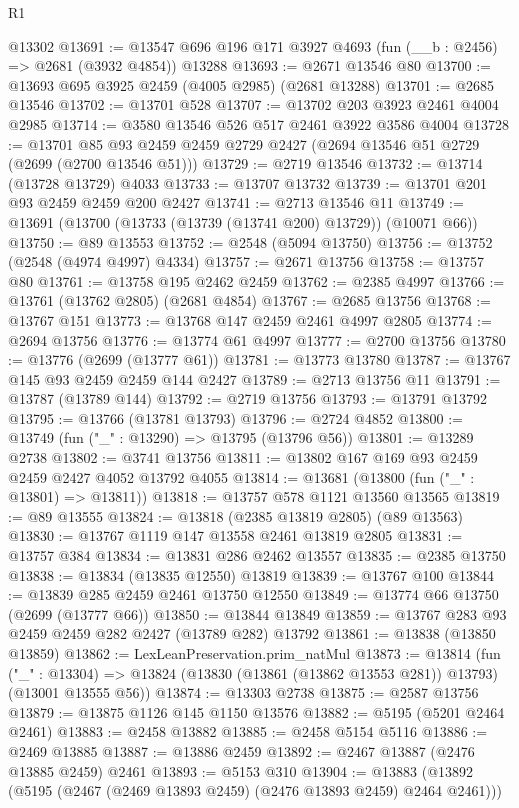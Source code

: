 \begin{lexlean}{R1}
\begin{coremodule}
    @13302
@13691 := @13547 @696 @196 @171 @3927 @4693 (fun (__b : @2456) => @2681 (@3932 @4854)) @13288
@13693 := @2671 @13546 @80
@13700 := @13693 @695 @3925 @2459 (@4005 @2985) (@2681 @13288)
@13701 := @2685 @13546
@13702 := @13701 @528
@13707 := @13702 @203 @3923 @2461 @4004 @2985
@13714 := @3580 @13546 @526 @517 @2461 @3922 @3586 @4004
@13728 := @13701 @85 @93 @2459 @2459 @2729 @2427 (@2694 @13546 @51 @2729 (@2699 (@2700 @13546 @51)))
@13729 := @2719 @13546
@13732 := @13714 (@13728 @13729) @4033
@13733 := @13707 @13732
@13739 := @13701 @201 @93 @2459 @2459 @200 @2427
@13741 := @2713 @13546 @11
@13749 := @13691 (@13700 (@13733 (@13739 (@13741 @200) @13729)) (@10071 @66))
@13750 := @89 @13553
@13752 := @2548 (@5094 @13750)
@13756 := @13752 (@2548 (@4974 @4997) @4334)
@13757 := @2671 @13756
@13758 := @13757 @80
@13761 := @13758 @195 @2462 @2459
@13762 := @2385 @4997
@13766 := @13761 (@13762 @2805) (@2681 @4854)
@13767 := @2685 @13756
@13768 := @13767 @151
@13773 := @13768 @147 @2459 @2461 @4997 @2805
@13774 := @2694 @13756
@13776 := @13774 @61 @4997
@13777 := @2700 @13756
@13780 := @13776 (@2699 (@13777 @61))
@13781 := @13773 @13780
@13787 := @13767 @145 @93 @2459 @2459 @144 @2427
@13789 := @2713 @13756 @11
@13791 := @13787 (@13789 @144)
@13792 := @2719 @13756
@13793 := @13791 @13792
@13795 := @13766 (@13781 @13793)
@13796 := @2724 @4852
@13800 := @13749 (fun ("_" : @13290) => @13795 (@13796 @56))
@13801 := @13289 @2738
@13802 := @3741 @13756
@13811 := @13802 @167 @169 @93 @2459 @2459 @2427 @4052 @13792 @4055
@13814 := @13681 (@13800 (fun ("_" : @13801) => @13811))
@13818 := @13757 @578 @1121 @13560 @13565
@13819 := @89 @13555
@13824 := @13818 (@2385 @13819 @2805) (@89 @13563)
@13830 := @13767 @1119 @147 @13558 @2461 @13819 @2805
@13831 := @13757 @384
@13834 := @13831 @286 @2462 @13557
@13835 := @2385 @13750
@13838 := @13834 (@13835 @12550) @13819
@13839 := @13767 @100
@13844 := @13839 @285 @2459 @2461 @13750 @12550
@13849 := @13774 @66 @13750 (@2699 (@13777 @66))
@13850 := @13844 @13849
@13859 := @13767 @283 @93 @2459 @2459 @282 @2427 (@13789 @282) @13792
@13861 := @13838 (@13850 @13859)
@13862 := LexLeanPreservation.prim_natMul
@13873 := @13814
    (fun ("_" : @13304) => @13824 (@13830 (@13861 (@13862 @13553 @281)) @13793) (@13001 @13555 @56))
@13874 := @13303 @2738
@13875 := @2587 @13756
@13879 := @13875 @1126 @145 @1150 @13576
@13882 := @5195 (@5201 @2464 @2461)
@13883 := @2458 @13882
@13885 := @2458 @5154 @5116
@13886 := @2469 @13885
@13887 := @13886 @2459
@13892 := @2467 @13887 (@2476 @13885 @2459) @2461
@13893 := @5153 @310
@13904 := @13883 (@13892 (@5195 (@2467 (@2469 @13893 @2459) (@2476 @13893 @2459) @2464 @2461)))

\end{coremodule}
\end{lexlean}
